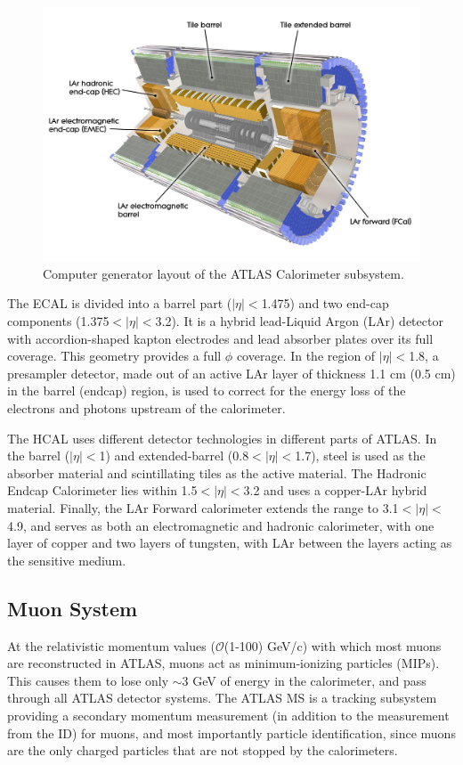 \begin{figure}[!ht]
    \centering
    \includegraphics[width=0.8\linewidth]{figures/experiment/Calorimeters.png}
    \caption{Computer generator layout of the ATLAS Calorimeter subsystem.~\cite{Pequenao:1095927}}
    \label{fig:calo}
\end{figure}

The ECAL is divided into a barrel part ($|\eta|<$1.475) and two end-cap components (1.375$<|\eta|<$3.2). It is a hybrid lead-Liquid Argon (LAr) detector with accordion-shaped kapton electrodes and lead absorber plates over its full coverage. This geometry provides a full $\phi$ coverage. In the region of $|\eta|<$1.8, a presampler detector, made out of an active LAr layer of thickness 1.1 cm (0.5 cm) in the barrel (endcap) region, is used to correct for the energy loss of the electrons and photons upstream of the calorimeter.

The HCAL uses different detector technologies in different parts of ATLAS. In the barrel ($|\eta|<$1) and extended-barrel (0.8$<|\eta|<$1.7), steel is used as the absorber material and scintillating tiles as the active material. The Hadronic Endcap Calorimeter lies within 1.5$<|\eta|<$3.2 and uses a copper-LAr hybrid material. Finally, the LAr Forward calorimeter extends the range to 3.1$<|\eta|<$4.9, and serves as both an electromagnetic and hadronic calorimeter, with one layer of copper and two layers of tungsten, with LAr between the layers acting as the sensitive medium. 

\subsection{Muon System}

At the relativistic momentum values ($\mathcal{O}$(1-100) GeV/c) with which most muons are reconstructed in ATLAS, muons act as minimum-ionizing particles (MIPs). This causes them to lose only $\sim$3 GeV of energy in the calorimeter, and pass through all ATLAS detector systems. The ATLAS MS is a tracking subsystem providing a secondary momentum measurement (in addition to the measurement from the ID) for muons, and most importantly particle identification, since muons are the only charged particles that are not stopped by the calorimeters.

